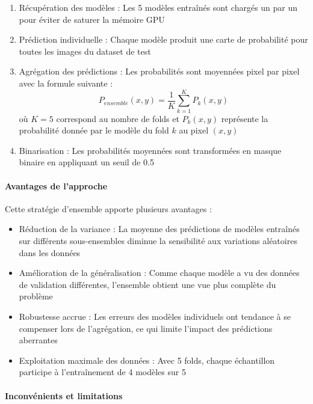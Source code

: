 \begin{enumerate}
    \item Récupération des modèles : Les 5 modèles entraînés sont chargés un par un pour éviter de saturer la mémoire GPU
    \item Prédiction individuelle : Chaque modèle produit une carte de probabilité pour toutes les images du dataset de test
    \item Agrégation des prédictions : Les probabilités sont moyennées pixel par pixel avec la formule suivante :
    \vspace{0.45cm}
    \begin{equation}
        P_{ensemble}(x,y) = \frac{1}{K} \sum_{k=1}^{K} P_k(x,y)
    \end{equation}
    où $K=5$ correspond au nombre de folds et $P_k(x,y)$ représente la probabilité donnée par le modèle du fold $k$ au pixel $(x,y)$
    \item Binarisation : Les probabilités moyennées sont transformées en masque binaire en appliquant un seuil de 0.5
\end{enumerate}

\paragraph{Avantages de l'approche}

Cette stratégie d'ensemble apporte plusieurs avantages :

\begin{itemize}
    \item Réduction de la variance : La moyenne des prédictions de modèles entraînés sur différents sous-ensembles diminue la sensibilité aux variations aléatoires dans les données
    \item Amélioration de la généralisation : Comme chaque modèle a vu des données de validation différentes, l'ensemble obtient une vue plus complète du problème
    \item Robustesse accrue : Les erreurs des modèles individuels ont tendance à se compenser lors de l'agrégation, ce qui limite l'impact des prédictions aberrantes
    \item Exploitation maximale des données : Avec 5 folds, chaque échantillon participe à l'entraînement de 4 modèles sur 5
\end{itemize}

\paragraph{Inconvénients et limitations}

